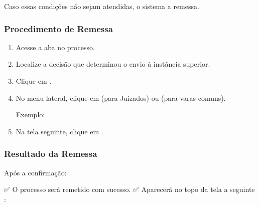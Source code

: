 \documentclass[letterpaper,10pt,brazil]{sphinxmanual}
\begin{document}
\sphinxAtStartPar
Caso essas condições não sejam atendidas, o sistema  a remessa.


\subsubsection{Procedimento de Remessa}
\label{\detokenize{projud_37_remessasegundograu:procedimento-de-remessa}}\begin{enumerate}
%
\item {} 
\sphinxAtStartPar
Acesse a aba  no processo.

\item {} 
\sphinxAtStartPar
Localize a decisão que determinou o envio à instância superior.

\item {} 
\sphinxAtStartPar
Clique em .

\item {} 
\sphinxAtStartPar
No menu lateral, clique em  (para Juizados) ou  (para varas comuns).

\sphinxAtStartPar
Exemplo:

\begin{sphinxVerbatim}[commandchars=\\\{\}]
\PYG{p}{[}  \PYG{p}{]}
    
\end{sphinxVerbatim}

\item {} 
\sphinxAtStartPar
Na tela seguinte, clique em .

\end{enumerate}


\subsubsection{Resultado da Remessa}
\label{\detokenize{projud_37_remessasegundograu:resultado-da-remessa}}
\sphinxAtStartPar
Após a confirmação:

\sphinxAtStartPar
✅ O processo será remetido com sucesso.
✅ Aparecerá no topo da tela a seguinte :
\begin{quote}

\begin{sphinxVerbatim}[commandchars=\\\{\}]
   
\end{sphinxVerbatim}
\end{quote}
\end{document}
